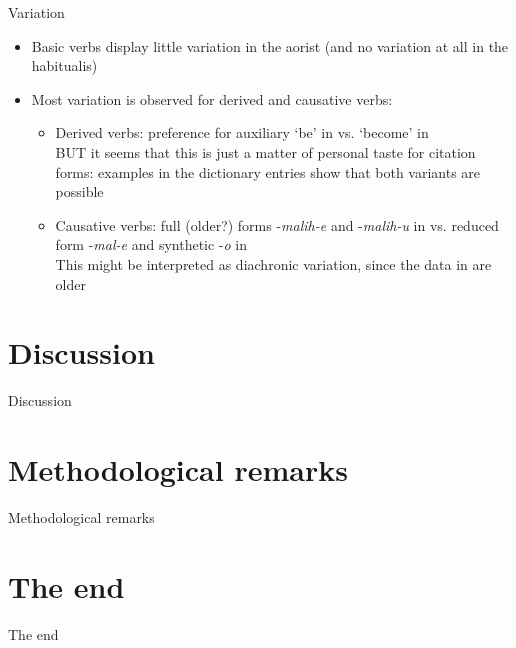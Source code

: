 \begin{frame}{Variation}
\begin{itemize}
    \item Basic verbs display little variation in the aorist (and no variation at all in the habitualis)
    \item Most variation is observed for derived and causative verbs:
    \begin{itemize}
        \item Derived verbs: preference for auxiliary `be' in \citet{saidovaabusov2012} vs. `become' in \citet{alekseev2019} \\ BUT it seems that this is just a matter of personal taste for citation forms: examples in the dictionary entries show that both variants are possible
        \item Causative verbs: full (older?) forms -\textit{malih-e} and -\textit{malih-u} in \citet{alekseev2019} vs. reduced form -\textit{mal-e} and synthetic -\textit{o} in \citet{saidovaabusov2012} \\ This might be interpreted as diachronic variation, since the data in \citet{alekseev2019} are older
    \end{itemize}
\end{itemize}
\end{frame}

\section{Discussion}
\begin{frame}{Discussion}
    
\end{frame}

\section{Methodological remarks}
\begin{frame}{Methodological remarks}
    
\end{frame}

\section{The end}
\begin{frame}{The end}
\begin{figure}[h]
\centering
{}
\end{figure}
\end{frame}

